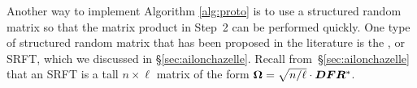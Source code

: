 \documentclass[12pt]{article}
\begin{document}
Another way to implement Algorithm \ref{alg:proto}
is to use a structured random matrix so that the matrix product in Step~2
can be performed quickly.  One type of structured random matrix that has
been proposed in the literature is the ,
or SRFT, which we discussed in \S\ref{sec:ailonchazelle}.
%
%
%
%
%
%
Recall from~\S\ref{sec:ailonchazelle} that an SRFT is a
tall $n \times \ell$ matrix of the form $\bm{\Omega} = \sqrt{n/\ell}
\cdot \bm{DFR}^*$.


\end{document}
